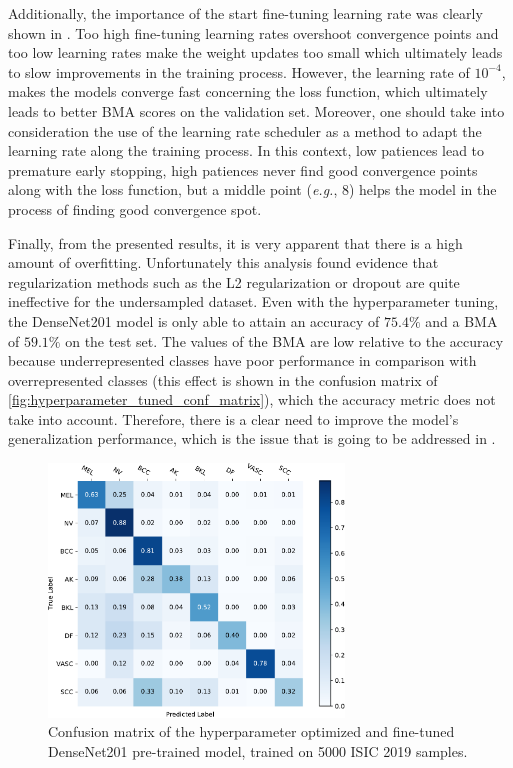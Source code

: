     Additionally, the importance of the start fine-tuning learning rate was clearly shown in . Too high fine-tuning learning rates overshoot convergence points and too low learning rates make the weight updates too small which ultimately leads to slow improvements in the training process. However, the learning rate of $10^{-4}$, makes the models converge fast concerning the loss function, which ultimately leads to better \ac{BMA} scores on the validation set. Moreover, one should take into consideration the use of the learning rate scheduler as a method to adapt the learning rate along the training process. In this context, low patiences lead to premature early stopping, high patiences never find good convergence points along with the loss function, but a middle point (\textit{e.g.}, 8) helps the model in the process of finding good convergence spot.
    
    Finally, from the presented results, it is very apparent that there is a high amount of overfitting. Unfortunately this analysis found evidence that regularization methods such as the L2 regularization or dropout are quite ineffective for the undersampled dataset. Even with the hyperparameter tuning, the DenseNet201 model is only able to attain an accuracy of $75.4\%$ and a \ac{BMA} of $59.1\%$ on the test set. The values of the \ac{BMA} are low relative to the accuracy because underrepresented classes have poor performance in comparison with overrepresented classes (this effect is shown in the confusion matrix of \autoref{fig:hyperparameter_tuned_conf_matrix}), which the accuracy metric does not take into account. Therefore, there is a clear need to improve the model's generalization performance, which is the issue that is going to be addressed in .\par
    
    \begin{figure}[ht]
        \centering
        \includegraphics[width=0.7\textwidth]{figs/densenet201_5000_tuned_conf_matrix.pdf}
        \caption{Confusion matrix of the hyperparameter optimized and fine-tuned DenseNet201 pre-trained model, trained on 5000 \ac{ISIC} 2019 samples.}
        \label{fig:hyperparameter_tuned_conf_matrix}
    \end{figure}
